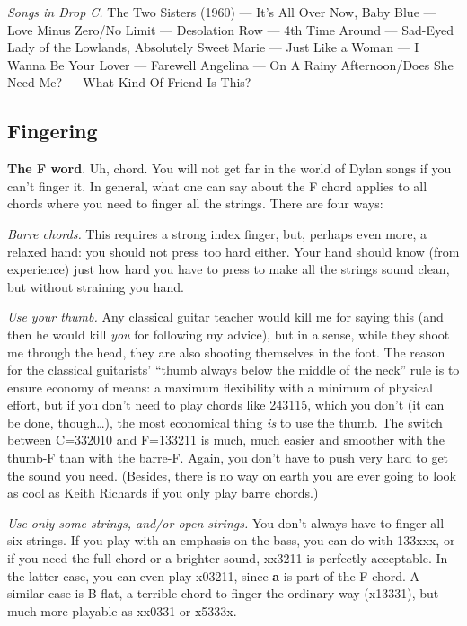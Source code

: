 \begin{articlelayout}
\emph{Songs in Drop C.} The Two Sisters (1960) --- It's All Over Now,
Baby Blue --- Love Minus Zero/No Limit --- Desolation Row ---
4th Time Around --- Sad-Eyed Lady of the
Lowlands, Absolutely Sweet Marie --- Just Like a
Woman --- I Wanna Be Your Lover --- Farewell Angelina --- On A Rainy
Afternoon/Does She Need Me? --- What Kind Of Friend Is This?


\subsection*{Fingering}

\textbf{The F word}. Uh, chord. You will not get far in the world of
Dylan songs if you can't finger it. In general, what one can say about
the F chord applies to all chords where you need to finger all the
strings. There are four ways:

\emph{Barre chords.} This requires a strong index finger, but, perhaps
even more, a relaxed hand: you should not press too hard either. Your
hand should know (from experience) just how hard you have to press to
make all the strings sound clean, but without straining you hand.

\emph{Use your thumb.} Any classical guitar teacher would kill me for
saying this (and then he would kill \emph{you} for following my
advice), but in a sense, while they shoot me through the head, they
are also shooting themselves in the foot. The reason for the classical guitarists' ``{}thumb
always below the middle of the neck''{} rule is to ensure economy of means: a maximum
flexibility with a minimum of physical effort, but if you don't
need to play chords like 243115, which you don't (it can be done,
though\ldots{}), the most economical thing \emph{is} to use the
thumb. The switch between C=332010 and F=133211 is much, much easier
and smoother with the thumb-F than with the barre-F. Again, you don't
have to push very hard to get the sound you need. (Besides, there is
no way on earth you are ever going to look as cool as Keith Richards
if you only play barre chords.)

\emph{Use only some strings, and/or open strings.} You don't always
have to finger all six strings. If you play with an emphasis on the
bass, you can do with 133xxx, or if you need the full chord or a
brighter sound, xx3211 is perfectly acceptable. In the latter case,
you can even play x03211, since \textbf{a} is part of the F chord. A
similar case is B flat, a terrible chord to finger the ordinary way
(x13331), but much more playable as xx0331 or x5333x.


\end{articlelayout}
